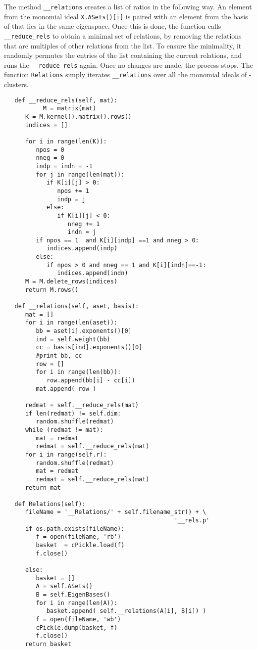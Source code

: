 \vspace{5pt}

The method \texttt{\_\_relations} creates a list of ratios in the following way. An element from the monomial ideal \texttt{X.ASets()[i]} is paired with an element from the basis of  that lies in the same eigenspace. Once this is done, the function calls \texttt{\_\_reduce\_rels} to obtain a minimal set of relations, by removing the relations that are multiples of other relations from the list. To ensure the minimality, it randomly permutes the entries of the list containing the current relations, and runs the \texttt{\_\_reduce\_rels} again. Once no changes are made, the process stops. The function \texttt{Relations} simply iterates \texttt{\_\_relations} over all the monomial ideals of -clusters.

\singlespacing
\begin{verbatim}
   def __reduce_rels(self, mat):
           M = matrix(mat)
      K = M.kernel().matrix().rows()
      indices = []

      for i in range(len(K)):
         npos = 0
         nneg = 0
         indp = indn = -1
         for j in range(len(mat)):
            if K[i][j] > 0:
               npos += 1
               indp = j
            else:
               if K[i][j] < 0:
                  nneg += 1
                  indn = j
         if npos == 1  and K[i][indp] ==1 and nneg > 0:
            indices.append(indp)
         else:
            if npos > 0 and nneg == 1 and K[i][indn]==-1:
               indices.append(indn)
      M = M.delete_rows(indices)
      return M.rows()

   def __relations(self, aset, basis):
      mat = []
      for i in range(len(aset)):
         bb = aset[i].exponents()[0]
         ind = self.weight(bb)
         cc = basis[ind].exponents()[0]
         #print bb, cc
         row = []
         for i in range(len(bb)):
            row.append(bb[i] - cc[i])
         mat.append( row )

      redmat = self.__reduce_rels(mat)
      if len(redmat) != self.dim:
         random.shuffle(redmat)
      while (redmat != mat):
         mat = redmat
         redmat = self.__reduce_rels(mat)
      for i in range(self.r):
         random.shuffle(redmat)
         mat = redmat
         redmat = self.__reduce_rels(mat)
      return mat
   
   def Relations(self):
      fileName = '__Relations/' + self.filename_str() + \
                                                '__rels.p'
      if os.path.exists(fileName):
         f = open(fileName, 'rb')
         basket  = cPickle.load(f)
         f.close()

      else:
         basket = []
         A = self.ASets()
         B = self.EigenBases()
         for i in range(len(A)):
            basket.append( self.__relations(A[i], B[i]) )
         f = open(fileName, 'wb')
         cPickle.dump(basket, f)
         f.close()   
      return basket
\end{verbatim}

